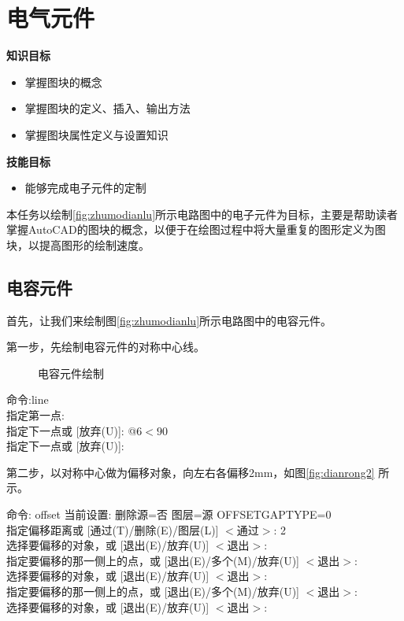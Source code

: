 \section{电气元件}\label{sec:dianqiyuanjian}

{\bfseries 知识目标}
\begin{itemize}
\item 掌握图块的概念
\item 掌握图块的定义、插入、输出方法
\item 掌握图块属性定义与设置知识
\end{itemize}

{\bfseries 技能目标}
\begin{itemize}
\item 能够完成电子元件的定制
\end{itemize}

本任务以绘制\ref{fig:zhumodianlu}所示电路图中的电子元件为目标，主要是帮助读者掌握AutoCAD的图块的概念，以便于在绘图过程中将大量重复的图形定义为图块，以提高图形的绘制速度。

\subsection{电容元件}
首先，让我们来绘制图\ref{fig:zhumodianlu}所示电路图中的电容元件。

第一步，先绘制电容元件的对称中心线。

\noindent
\begin{figure}[htbp]
\centering
{}\hspace{20pt}
\hspace{20pt}
\caption{电容元件绘制}
\end{figure}
\noindent

命令:line\\
指定第一点:\\
指定下一点或 [放弃(U)]: @6$<90$\\
指定下一点或 [放弃(U)]:\\
\indent

第二步，以对称中心做为偏移对象，向左右各偏移2mm，如图\ref{fig:dianrong2} 所示。

\noindent
命令: offset
当前设置: 删除源=否  图层=源  OFFSETGAPTYPE=0\\
指定偏移距离或 [通过(T)/删除(E)/图层(L)] $<$通过$>$:  2\\
选择要偏移的对象，或 [退出(E)/放弃(U)] $<$退出$>$:\\
指定要偏移的那一侧上的点，或 [退出(E)/多个(M)/放弃(U)] $<$退出$>$:\\
选择要偏移的对象，或 [退出(E)/放弃(U)] $<$退出$>$:\\
指定要偏移的那一侧上的点，或 [退出(E)/多个(M)/放弃(U)] $<$退出$>$:\\
选择要偏移的对象，或 [退出(E)/放弃(U)] $<$退出$>$:\\
\indent

